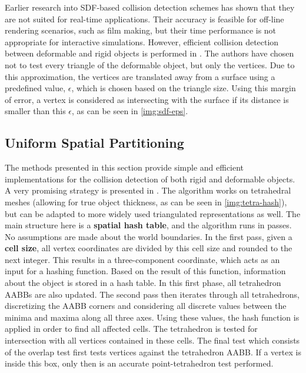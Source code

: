 Earlier research into SDF-based collision detection schemes has shown that they are not suited for real-time applications. Their accuracy is feasible for off-line rendering scenarios, such as film making, but their time performance is not appropriate for interactive simulations. However, efficient collision detection between deformable and rigid objects is performed in \citep{fsg03}. The authors have chosen not to test every triangle of the deformable object, but only the vertices. Due to this approximation, the vertices are translated away from a surface using a predefined value, $\epsilon$, which is chosen based on the triangle size. Using this margin of error, a vertex is considered as intersecting with the surface if its distance is smaller than this $\epsilon$, as can be seen in \autoref{img:sdf-eps}.

\subsection{Uniform Spatial Partitioning}
\label{sub-sec:usp}



The methods presented in this section provide simple and efficient implementations for the collision detection of both rigid and deformable objects. A very promising strategy is presented in \citep{thm03}. The algorithm works on tetrahedral meshes (allowing for true object thickness, as can be seen in \autoref{img:tetra-hash}), but can be adapted to more widely used triangulated representations as well. The main structure here is a \textbf{spatial hash table}, and the algorithm runs in passes. No assumptions are made about the world boundaries. In the first pass, given a \textbf{cell size}, all vertex coordinates are divided by this cell size and rounded to the next integer. This results in a three-component coordinate, which acts as an input for a hashing function. Based on the result of this function, information about the object is stored in a hash table. In this first phase, all tetrahedron AABBs are also updated. The second pass then iterates through all tetrahedrons, discretizing the AABB corners and considering all discrete values between the minima and maxima along all three axes. Using these values, the hash function is applied in order to find all affected cells. The tetrahedron is tested for intersection with all vertices contained in these cells. The final test which consists of the overlap test first tests vertices against the tetrahedron AABB. If a vertex is inside this box, only then is an accurate point-tetrahedron test performed.

